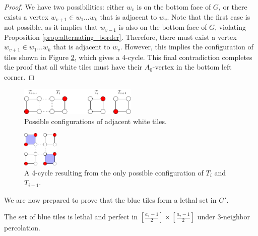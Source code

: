 \begin{proof}
We have two possibilities: either $w_v$ is on the bottom face of $G$, or there exists a vertex $w_{v+1} \in w_1 \dots w_k$ that is adjacent to $w_v$. Note that the first case is not possible, as it implies that $w_{v-1}$ is also on the bottom face of $G$, violating Proposition \ref{prop:alternating_border}. Therefore, there must exist a vertex $w_{v+1} \in w_1 \dots w_k$ that is adjacent to $w_v$. However, this implies the configuration of tiles shown in Figure \ref{fig:tile_cycle}, which gives a 4-cycle. This final contradiction completes the proof that all white tiles must have their $A_0$-vertex in the bottom left corner.


\end{proof}

\begin{figure}[]
\centering
\includegraphics[width=0.5\textwidth]{figures/6/tile_cases.pdf}
\caption{Possible configurations of adjacent white tiles.}
\label{fig:tile_cases}
\end{figure} 

\begin{figure}[]
\centering
\includegraphics[width=0.15\textwidth]{figures/6/tile_cycle.pdf}
\caption{A 4-cycle resulting from the only possible configuration of $T_i$ and $T_{i+1}$.}
\label{fig:tile_cycle}
\end{figure} 

We are now prepared to prove that the blue tiles form a lethal set in $G'$.

\begin{lem}
\label{lem:blue_lethal}
The set of blue tiles is lethal and perfect in $[\tfrac{a_1-1}{2}] \times [\tfrac{a_2-1}{2}]$ under 3-neighbor percolation.
\end{lem}

